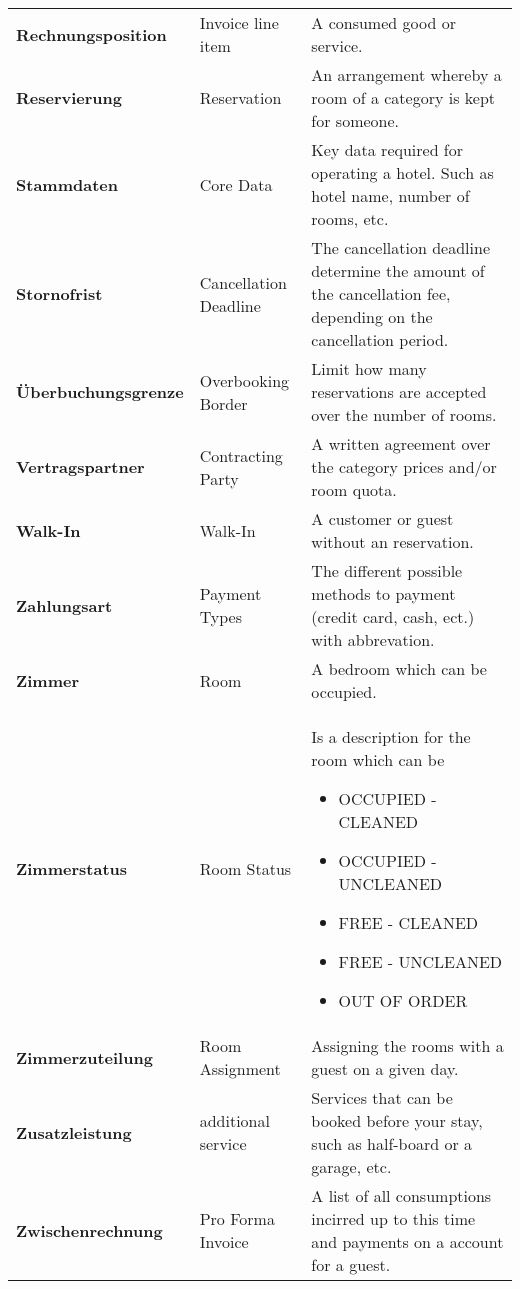 \documentclass[../Pflichtenheft.tex]{subfiles}
\begin{document}
\begin{longtable}{p{4cm} p{4cm} p{6cm}}
        \textbf{Rechnungsposition} & {Invoice line item} & A consumed good or service. \\[0.5cm]
        \textbf{Reservierung} & {Reservation} & An arrangement whereby a room of a category is kept for someone. \\[0.5cm]
        \textbf{Stammdaten} & {Core Data} & Key data required for operating a hotel. Such as hotel name, number of rooms, etc. \\[0.5cm]
        \textbf{Stornofrist} & {Cancellation Deadline} & The cancellation deadline determine the amount of the cancellation fee, depending on the cancellation period. \\[0.5cm]
        \textbf{Überbuchungsgrenze} & {Overbooking Border} & Limit how many reservations are accepted over the number of rooms. \\[0.5cm]
        \textbf{Vertragspartner} & {Contracting Party} & A written agreement over the category prices and/or room quota. \\[0.5cm]
        \textbf{Walk-In} & {Walk-In} & A customer or guest without an reservation. \\[0.5cm]
        \textbf{Zahlungsart} & {Payment Types} & The different possible methods to payment (credit card, cash, ect.) with abbrevation. \\[0.5cm]
		\textbf{Zimmer} & {Room} & A bedroom which can be occupied. \\[0.5cm]
        \textbf{Zimmerstatus} & {Room Status} & Is a description for the room which can be \begin{itemize}
                                                                                               \item OCCUPIED - CLEANED
                                                                                               \item OCCUPIED - UNCLEANED
                                                                                               \item FREE - CLEANED
                                                                                               \item FREE - UNCLEANED
                                                                                               \item OUT OF ORDER
        \end{itemize} \\[0.5cm]
		\textbf{Zimmerzuteilung} & {Room Assignment} & Assigning the rooms with a guest on a given day. \\[0.5cm]
        \textbf{Zusatzleistung} & {additional service} & Services that can be booked before your stay, such as half-board or a garage, etc. \\[0.5cm]
        \textbf{Zwischenrechnung} & {Pro Forma Invoice} & A list of all consumptions incirred up to this time and payments on a account for a guest. \\[0.5cm]
	\end{longtable}
\end{document}
